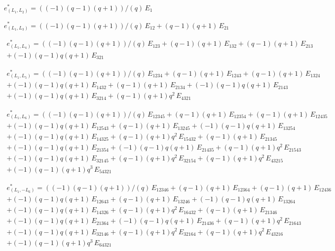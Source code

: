 $e^*_{(L_1, L_2)} = ((-1) (q-1) (q+1))/(q)\, E_{1}$

$e^*_{(L_1, L_3)} = ((-1) (q-1) (q+1))/(q)\, E_{12} + (q-1) (q+1)\, E_{21}$

\begin{multline*}
e^*_{(L_1, L_4)} = 
  ((-1) (q-1) (q+1))/(q)\, E_{123} + (q-1) (q+1)\, E_{132} + (q-1) (q+1)\, E_{213}
  \\
  + (-1) (q-1) q (q+1)\, E_{321}
\end{multline*}

\begin{multline*}
e^*_{(L_1, L_5)} = 
  ((-1) (q-1) (q+1))/(q)\, E_{1234} + (q-1) (q+1)\, E_{1243} + (q-1) (q+1)\, E_{1324}
  \\
  + (-1) (q-1) q (q+1)\, E_{1432} + (q-1) (q+1)\, E_{2134} + (-1) (q-1) q (q+1)\, E_{2143}
  \\
  + (-1) (q-1) q (q+1)\, E_{3214} + (q-1) (q+1) q^2\, E_{4321}
\end{multline*}

\begin{multline*}
e^*_{(L_1, L_6)} = 
  ((-1) (q-1) (q+1))/(q)\, E_{12345} + (q-1) (q+1)\, E_{12354} + (q-1) (q+1)\, E_{12435}
  \\
  + (-1) (q-1) q (q+1)\, E_{12543} + (q-1) (q+1)\, E_{13245} + (-1) (q-1) q (q+1)\, E_{13254}
  \\
  + (-1) (q-1) q (q+1)\, E_{14325} + (q-1) (q+1) q^2\, E_{15432} + (q-1) (q+1)\, E_{21345}
  \\
  + (-1) (q-1) q (q+1)\, E_{21354} + (-1) (q-1) q (q+1)\, E_{21435} + (q-1) (q+1) q^2\, E_{21543}
  \\
  + (-1) (q-1) q (q+1)\, E_{32145} + (q-1) (q+1) q^2\, E_{32154} + (q-1) (q+1) q^2\, E_{43215}
  \\
  + (-1) (q-1) (q+1) q^3\, E_{54321}
\end{multline*}

\begin{multline*}
e^*_{(L_1, -L_6)} = 
  ((-1) (q-1) (q+1))/(q)\, E_{12346} + (q-1) (q+1)\, E_{12364} + (q-1) (q+1)\, E_{12436}
  \\
  + (-1) (q-1) q (q+1)\, E_{12643} + (q-1) (q+1)\, E_{13246} + (-1) (q-1) q (q+1)\, E_{13264}
  \\
  + (-1) (q-1) q (q+1)\, E_{14326} + (q-1) (q+1) q^2\, E_{16432} + (q-1) (q+1)\, E_{21346}
  \\
  + (-1) (q-1) q (q+1)\, E_{21364} + (-1) (q-1) q (q+1)\, E_{21436} + (q-1) (q+1) q^2\, E_{21643}
  \\
  + (-1) (q-1) q (q+1)\, E_{32146} + (q-1) (q+1) q^2\, E_{32164} + (q-1) (q+1) q^2\, E_{43216}
  \\
  + (-1) (q-1) (q+1) q^3\, E_{64321}
\end{multline*}

